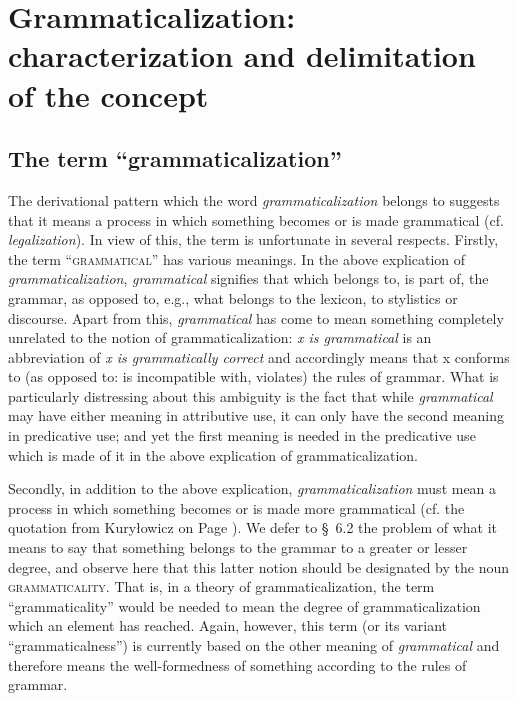 \chapter{Grammaticalization: characterization and delimitation of the concept} \label{chap:2}

\section{The term ``grammaticalization''} \label{sec:2.1}

The derivational pattern which the word \textit{grammaticalization} belongs to suggests that it means a process in which something becomes or is made grammatical (cf. \textit{legalization}). In view of this, the term is unfortunate in several respects. Firstly, the term ``\textsc{grammatical}'' has various meanings. In the above explication of \textit{grammaticalization}, \textit{grammatical} signifies that which belongs to, is part of, the grammar, as opposed to, e.g., what belongs to the lexicon, to stylistics or discourse. Apart from this, \textit{grammatical} has come to mean something completely unrelated to the notion of grammaticalization: \textit{x is grammatical} is an abbreviation of \textit{x is grammatically correct} and accordingly means that x conforms to (as opposed to: is incompatible with, violates) the rules of grammar. What is particularly distressing about this ambiguity is the fact that while \textit{grammatical} may have either meaning in attributive use, it can only have the second meaning in predicative use; and yet the first meaning is needed in the predicative use which is made of it in the above explication of grammaticalization.

Secondly, in addition to the above explication, \textit{grammaticalization} must mean a process in which something becomes or is made  more grammatical (cf. the quotation from Kuryłowicz on Page \pageref{quote:kurylowciz}). We defer to §~6.2 the problem of what it means to say that something belongs to the grammar to a greater or lesser degree, and observe here that this latter notion should be designated by the noun \textsc{grammaticality}. That is, in a theory of grammaticalization, the term ``grammaticality'' would be needed to mean the degree of grammaticalization which an element has reached. Again, however, this term (or its variant ``grammaticalness'') is currently based on the other meaning of \textit{grammatical} and therefore means the well-formedness of something according to the rules of grammar.

